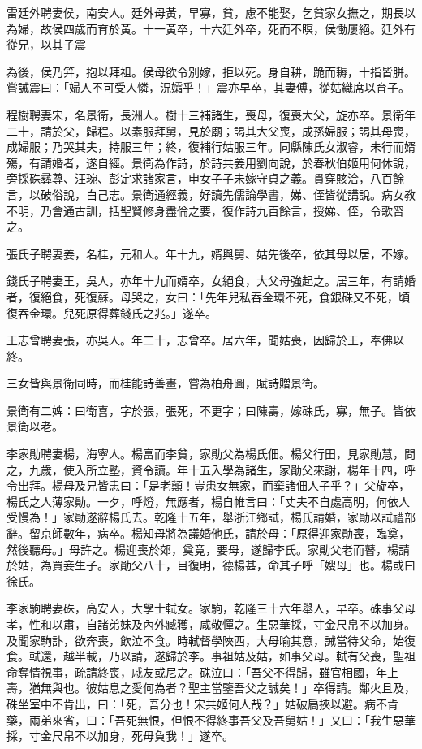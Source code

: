 \begin{pinyinscope}
雷廷外聘妻侯，南安人。廷外母黃，早寡，貧，慮不能娶，乞貧家女撫之，期長以為婦，故侯四歲而育於黃。十一黃卒，十六廷外卒，死而不瞑，侯慟屢絕。廷外有從兄，以其子震

為後，侯乃笄，抱以拜祖。侯母欲令別嫁，拒以死。身自耕，跪而耨，十指皆胼。嘗誡震曰：「婦人不可受人憐，況孀乎！」震亦早卒，其妻傅，從姑織席以育子。

程樹聘妻宋，名景衛，長洲人。樹十三補諸生，喪母，復喪大父，旋亦卒。景衛年二十，請於父，歸程。以素服拜舅，見於廟；謁其大父喪，成孫婦服；謁其母喪，成婦服；乃哭其夫，持服三年；終，復補行姑服三年。同縣陳氏女淑睿，未行而婿殤，有請婚者，遂自經。景衛為作詩，於詩共姜用劉向說，於春秋伯姬用何休說，旁採硃彞尊、汪琬、彭定求諸家言，申女子子未嫁守貞之義。貫穿賅洽，八百餘言，以破俗說，白己志。景衛通經義，好讀先儒論學書，娣、侄皆從講說。病女教不明，乃會通古訓，括聖賢修身盡倫之要，復作詩九百餘言，授娣、侄，令歌習之。

張氏子聘妻姜，名桂，元和人。年十九，婿與舅、姑先後卒，依其母以居，不嫁。

錢氏子聘妻王，吳人，亦年十九而婿卒，女絕食，大父母強起之。居三年，有請婚者，復絕食，死復蘇。母哭之，女曰：「先年兒私吞金環不死，食銀硃又不死，頃復吞金環。兒死原得葬錢氏之兆。」遂卒。

王志曾聘妻張，亦吳人。年二十，志曾卒。居六年，聞姑喪，因歸於王，奉佛以終。

三女皆與景衛同時，而桂能詩善畫，嘗為柏舟圖，賦詩贈景衛。

景衛有二婢：曰衛喜，字於張，張死，不更字；曰陳壽，嫁硃氏，寡，無子。皆依景衛以老。

李家勛聘妻楊，海寧人。楊富而李貧，家勛父為楊氏佃。楊父行田，見家勛慧，問之，九歲，使入所立塾，資令讀。年十五入學為諸生，家勛父來謝，楊年十四，呼令出拜。楊母及兄皆恚曰：「是老顛！豈患女無家，而棄諸佃人子乎？」父旋卒，楊氏之人薄家勛。一夕，呼燈，無應者，楊自帷言曰：「丈夫不自處高明，何依人受慢為！」家勛遂辭楊氏去。乾隆十五年，舉浙江鄉試，楊氏請婚，家勛以試禮部辭。留京師數年，病卒。楊知母將為議婚他氏，請於母：「原得迎家勛喪，臨奠，然後聽母。」母許之。楊迎喪於郊，奠竟，要母，遂歸李氏。家勛父老而瞽，楊請於姑，為買妾生子。家勛父八十，目復明，德楊甚，命其子呼「嫂母」也。楊或曰徐氏。

李家駒聘妻硃，高安人，大學士軾女。家駒，乾隆三十六年舉人，早卒。硃事父母孝，性和以肅，自諸弟妹及內外臧獲，咸敬憚之。生惡華採，寸金尺帛不以加身。及聞家駒訃，欲奔喪，飲泣不食。時軾督學陜西，大母喻其意，誡當待父命，始復食。軾還，越半載，乃以請，遂歸於李。事祖姑及姑，如事父母。軾有父喪，聖祖命奪情視事，疏請終喪，戚友或尼之。硃泣曰：「吾父不得歸，雖官相國，年上壽，猶無與也。彼姑息之愛何為者？聖主當鑒吾父之誠矣！」卒得請。鄰火且及，硃坐室中不肯出，曰：「死，吾分也！宋共姬何人哉？」姑破扃挾以避。病不肯藥，兩弟來省，曰：「吾死無恨，但恨不得終事吾父及吾舅姑！」又曰：「我生惡華採，寸金尺帛不以加身，死毋負我！」遂卒。


\end{pinyinscope}
